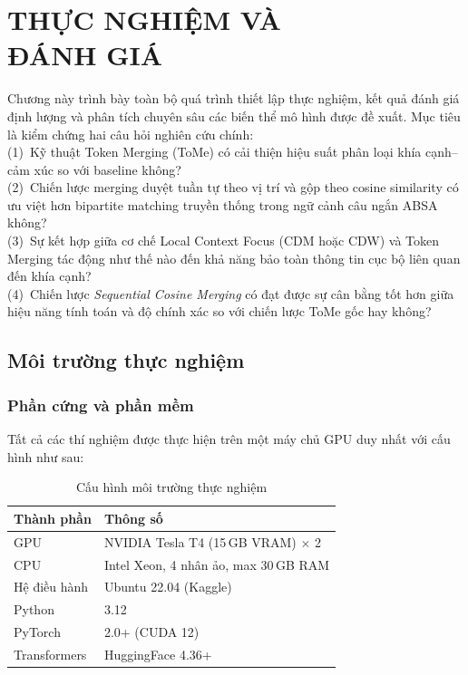 \providecommand{\cmark}{\ensuremath{\checkmark}}
\providecommand{\xmark}{\ensuremath{\times}}

\chapter{THỰC NGHIỆM VÀ \\ĐÁNH GIÁ}
\label{chap:experiments}

Chương này trình bày toàn bộ quá trình thiết lập thực nghiệm, kết quả
đánh giá định lượng và phân tích chuyên sâu các biến thể mô hình được
đề xuất. Mục tiêu là kiểm chứng hai câu hỏi nghiên cứu chính:
\\(1)~Kỹ thuật Token Merging (ToMe) có cải thiện hiệu suất phân loại
khía cạnh–cảm xúc so với baseline không?
\\(2)~Chiến lược merging duyệt tuần tự theo vị trí và gộp theo cosine similarity có ưu việt hơn
bipartite matching truyền thống trong ngữ cảnh câu ngắn ABSA không?
\\(3)~Sự kết hợp giữa cơ chế Local Context Focus (CDM
hoặc CDW) và Token Merging tác động như thế nào đến khả năng bảo
toàn thông tin cục bộ liên quan đến khía cạnh?
\\(4)~Chiến lược \textit{Sequential Cosine Merging}
có đạt được sự cân bằng tốt hơn giữa hiệu năng tính toán và độ
chính xác so với chiến lược ToMe gốc hay không?

\section{Môi trường thực nghiệm}
\label{sec:exp_setup}

\subsection{Phần cứng và phần mềm}

Tất cả các thí nghiệm được thực hiện trên một máy chủ GPU duy nhất
với cấu hình như sau:

\begin{table}[H]
\centering
\caption{Cấu hình môi trường thực nghiệm}
\label{tab:env}
\begin{tabular}{ll}
\toprule
\textbf{Thành phần} & \textbf{Thông số} \\
\midrule
GPU  & NVIDIA Tesla T4 (15\,GB VRAM) $\times$ 2 \\
CPU  & Intel Xeon, 4 nhân ảo, max 30\,GB RAM \\
Hệ điều hành & Ubuntu 22.04 (Kaggle) \\
Python & 3.12 \\
PyTorch & 2.0+ (CUDA 12) \\
Transformers & HuggingFace 4.36+ \\
\bottomrule
\end{tabular}
\end{table}

